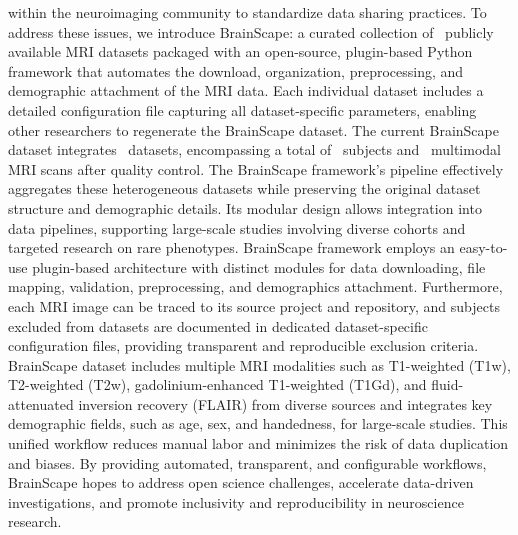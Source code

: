 within the neuroimaging community to standardize data sharing practices. 
To address these issues, we introduce BrainScape: a curated collection of \NumDatasets\ publicly available MRI datasets 
packaged with an open-source, plugin-based Python framework that automates the download, organization, preprocessing, and demographic attachment of the MRI data. 
Each individual dataset includes a detailed configuration file capturing all dataset-specific parameters, 
enabling other researchers to regenerate the BrainScape dataset. 
The current BrainScape dataset integrates \NumDatasets\ datasets,
encompassing a total of \TotalSubjectsIncludedAfterInspectionCount\ subjects and \TotalNumMRIs\ multimodal MRI scans after quality control. 
The BrainScape framework's pipeline effectively aggregates these heterogeneous datasets while preserving the original dataset structure and demographic details.
Its modular design allows integration into data pipelines, supporting large-scale studies involving diverse cohorts and targeted research on rare phenotypes. 
BrainScape framework employs an easy-to-use plugin-based architecture with distinct modules for data downloading, file mapping, validation, preprocessing, and demographics attachment. 
Furthermore, each MRI image can be traced to its source project and repository, and subjects excluded from datasets are documented in dedicated dataset-specific configuration files, 
providing transparent and reproducible exclusion criteria.
BrainScape dataset includes multiple MRI modalities such as T1-weighted (T1w), T2-weighted (T2w), 
gadolinium-enhanced T1-weighted (T1Gd), and fluid-attenuated inversion recovery (FLAIR) from diverse sources 
and integrates key demographic fields, such as age, sex, and handedness, for large-scale studies.
This unified workflow reduces manual labor and minimizes the risk of data duplication and biases. 
By providing automated, transparent, and configurable workflows, 
BrainScape hopes to address open science challenges, accelerate data-driven investigations, 
and promote inclusivity and reproducibility in neuroscience research. 
